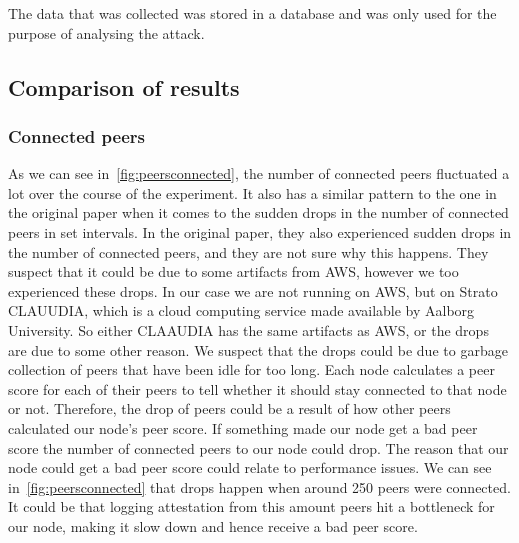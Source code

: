 The data that was collected was stored in a database and was only used for the purpose of analysing the attack.

\subsection{Comparison of results}\label{subsec:res-comparison}

\subsubsection{Connected peers}\label{subsubsec:connected-peers}
As we can see in~\autoref{fig:peersconnected}, the number of connected peers fluctuated a lot over the course of the experiment.
It also has a similar pattern to the one in the original paper when it comes to the sudden drops in the number of connected peers in set intervals.
In the original paper, they also experienced sudden drops in the number of connected peers, and they are not sure why this happens.
They suspect that it could be due to some artifacts from AWS, however we too experienced these drops.
In our case we are not running on AWS, but on Strato CLAUUDIA, which is a cloud computing service made available by Aalborg University.
So either CLAAUDIA has the same artifacts as AWS, or the drops are due to some other reason.
We suspect that the drops could be due to garbage collection of peers that have been idle for too long.
Each node calculates a peer score for each of their peers to tell whether it should stay connected to that node or not.
Therefore, the drop of peers could be a result of how other peers calculated our node's peer score.
If something made our node get a bad peer score the number of connected peers to our node could drop.
The reason that our node could get a bad peer score could relate to performance issues.
We can see in~\autoref{fig:peersconnected} that drops happen when around 250 peers were connected.
It could be that logging attestation from this amount peers hit a bottleneck for our node, making it slow down and hence receive a bad peer score.

